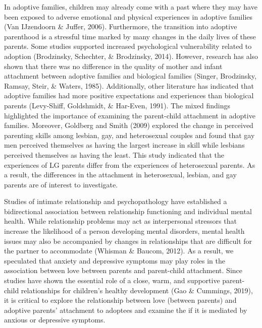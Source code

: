 \documentclass[man]{apa6}
\begin{document}
In adoptive families, children may already come with a past where they may have been exposed to adverse emotional and physical experiences in adoptive families (Van IJzendoorn \& Juffer, 2006). Furthermore, the transition into adoptive parenthood is a stressful time marked by many changes in the daily lives of these parents. Some studies supported increased psychological vulnerability related to adoption (Brodzinsky, Schechter, \& Brodzinsky, 2014). However, research has also shown that there was no difference in the quality of mother and infant attachment between adoptive families and biological families (Singer, Brodzinsky, Ramsay, Steir, \& Waters, 1985). Additionally, other literature has indicated that adoptive families had more positive expectations and experiences than biological parents (Levy-Shiff, Goldshmidt, \& Har-Even, 1991). The mixed findings highlighted the importance of examining the parent-child attachment in adoptive families. Moreover, Goldberg and Smith (2009) explored the change in perceived parenting skills among lesbian, gay, and heterosexual couples and found that gay men perceived themselves as having the largest increase in skill while lesbians perceived themselves as having the least. This study indicated that the experiences of LG parents differ from the experiences of heterosexual parents. As a result, the differences in the attachment in heterosexual, lesbian, and gay parents are of interest to investigate.

Studies of intimate relationship and psychopathology have established a bidirectional association between relationship functioning and individual mental health. While relationship problems may act as interpersonal stressors that increase the likelihood of a person developing mental disorders, mental health issues may also be accompanied by changes in relationships that are difficult for the partner to accommodate (Whisman \& Baucom, 2012). As a result, we speculated that anxiety and depressive symptoms may play roles in the association between love between parents and parent-child attachment. Since studies have shown the essential role of a close, warm, and supportive parent-child relationships for children's healthy development (Gao \& Cummings, 2019), it is critical to explore the relationship between love (between parents) and adoptive parents' attachment to adoptees and examine the if it is mediated by anxious or depressive symptoms.
\end{document}
